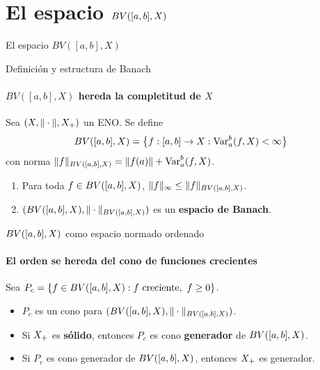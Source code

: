 \section{El espacio $BV([a,b],X)$}

\begin{frame}{}
\begin{block}{}
\centering\large
El espacio $BV([a,b],X)$
\end{block}
\end{frame}


\begin{frame}{Definición y estructura de Banach}
\framesubtitle{$BV([a,b],X)$ hereda la completitud de $X$}

\begin{definition}
Sea $(X,\|\cdot\|,X_{+})$ un ENO. Se define
\[
BV([a,b],X) = \bigl\{f:[a,b]\to X : \operatorname{Var}_a^b(f,X)<\infty\bigr\}
\]
con norma $\|f\|_{BV([a,b],X)} = \|f(a)\| + \operatorname{Var}_a^b(f,X)$.
\end{definition}

\medskip

\begin{theorem}
\begin{enumerate}
  \item Para toda $f\in BV([a,b],X)$,
        $\|f\|_\infty \le \|f\|_{BV([a,b],X)}$.
  \item $(BV([a,b],X),\|\cdot\|_{BV([a,b],X)})$ es un \textbf{espacio de Banach}.
\end{enumerate}
\end{theorem}

\end{frame}


\begin{frame}{$BV([a,b],X)$ como espacio normado ordenado}
\framesubtitle{El orden se hereda del cono de funciones crecientes}

Sea $P_c = \{f\in BV([a,b],X) : f \text{ creciente},\ f\ge 0\}$.

\medskip

\begin{theorem}
\begin{itemize}
  \item[--] $P_c$ es un cono para $(BV([a,b],X),\|\cdot\|_{BV([a,b],X)})$.
  \item[--] Si $X_{+}$ es \textbf{sólido}, entonces $P_c$ es cono
            \textbf{generador} de $BV([a,b],X)$.
  \item[--] Si $P_c$ es cono generador de $BV([a,b],X)$, entonces $X_{+}$
            es generador.
\end{itemize}
\end{theorem}

\end{frame}

